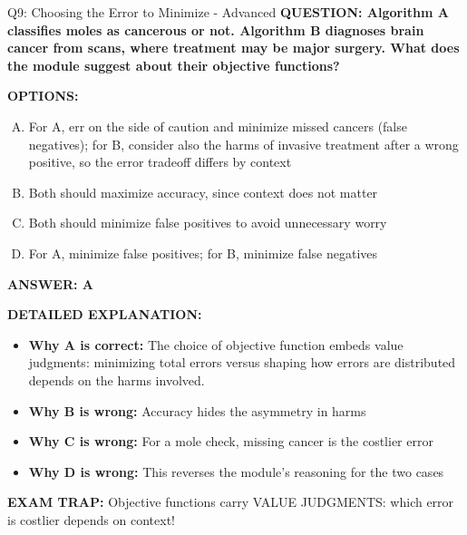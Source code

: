 \documentclass[8pt]{beamer}
\begin{document}
\begin{frame}[shrink=6]{Q9: Choosing the Error to Minimize - Advanced}
\fontsize{6.5}{7.5}\selectfont
\textbf{QUESTION: Algorithm A classifies moles as cancerous or not. Algorithm B diagnoses brain cancer from scans, where treatment may be major surgery. What does the module suggest about their objective functions?}

\vspace{0.1cm}
\textbf{OPTIONS:}
\begin{enumerate}[A.]
\item For A, err on the side of caution and minimize missed cancers (false negatives); for B, consider also the harms of invasive treatment after a wrong positive, so the error tradeoff differs by context
\item Both should maximize accuracy, since context does not matter
\item Both should minimize false positives to avoid unnecessary worry
\item For A, minimize false positives; for B, minimize false negatives
\end{enumerate}

\vspace{0.1cm}
\textcolor{myblue}{\textbf{ANSWER: A}}

\vspace{0.1cm}
\textbf{DETAILED EXPLANATION:}
\begin{itemize}
\item \textbf{Why A is correct:} The choice of objective function embeds value judgments: minimizing total errors versus shaping how errors are distributed depends on the harms involved.
\item \textbf{Why B is wrong:} Accuracy hides the asymmetry in harms
\item \textbf{Why C is wrong:} For a mole check, missing cancer is the costlier error
\item \textbf{Why D is wrong:} This reverses the module's reasoning for the two cases
\end{itemize}

\textcolor{myred}{\textbf{EXAM TRAP:}} Objective functions carry VALUE JUDGMENTS: which error is costlier depends on context!
\end{frame}

\end{document}
